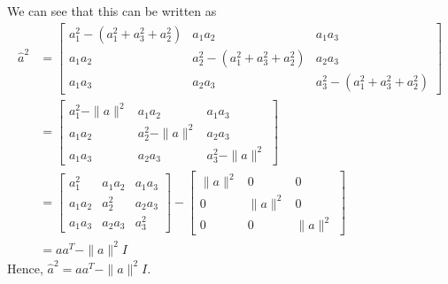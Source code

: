 We can see that this can be written as
\begin{align*}
     \hat{a}^{2}
      & =
     \begin{bmatrix}
          a_{1}^{2}-(a_{1}^{2}+a_{3}^{2}+a_{2}^{2}) & a_{1} a_{2}                               & a_{1} a_{3}                               \\
          a_{1} a_{2}                               & a_{2}^{2}-(a_{1}^{2}+a_{3}^{2}+a_{2}^{2}) & a_{2} a_{3}                               \\
          a_{1} a_{3}                               & a_{2} a_{3}                               & a_{3}^{2}-(a_{1}^{2}+a_{3}^{2}+a_{2}^{2})
     \end{bmatrix}
     \\ & =
     \begin{bmatrix}
          a_{1}^{2}-\|a\|^{2} & a_{1} a_{2}         & a_{1} a_{3}         \\
          a_{1} a_{2}         & a_{2}^{2}-\|a\|^{2} & a_{2} a_{3}         \\
          a_{1} a_{3}         & a_{2} a_{3}         & a_{3}^{2}-\|a\|^{2}
     \end{bmatrix}
     \\ & =
     \begin{bmatrix}
          a_{1}^{2}   & a_{1} a_{2} & a_{1} a_{3} \\
          a_{1} a_{2} & a_{2}^{2}   & a_{2} a_{3} \\
          a_{1} a_{3} & a_{2} a_{3} & a_{3}^{2}
     \end{bmatrix}
     -
     \begin{bmatrix}
          \|a\|^{2} & 0         & 0         \\
          0         & \|a\|^{2} & 0         \\
          0         & 0         & \|a\|^{2}
     \end{bmatrix}
     \\ & =
     a a^{T}-\|a\|^{2} I
\end{align*}
Hence, \( \hat{a}^{2}=a a^{T}-\|a\|^{2} I \).
